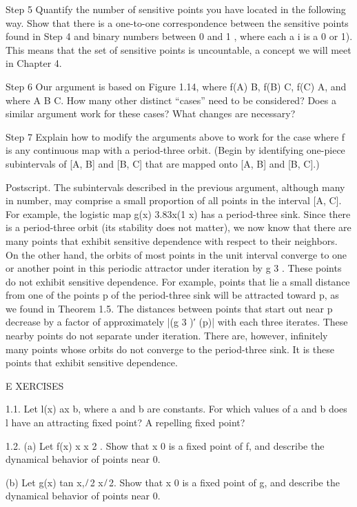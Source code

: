 \documentclass[12pt]{article}
\begin{document}
Step 5 Quantify the number of sensitive points you have located in the following way. Show that there is a 
one-to-one correspondence between the sensitive points found in Step 4 and binary numbers between 0 and 1 
, where each a i is a 0 or 1). This means that the set of sensitive points is uncountable, a concept we 
will meet in Chapter 4.

Step 6 Our argument is based on Figure 1.14, where f(A)  B, f(B)  C, f(C)  A, and where A  B  C. How many 
other distinct “cases” need to be considered? Does a similar argument work for these cases? What changes 
are necessary?

Step 7 Explain how to modify the arguments above to work for the case where f is any continuous map with a 
period-three orbit. (Begin by identifying one-piece subintervals of [A, B] and [B, C] that are mapped onto 
[A, B] and [B, C].)

Postscript. The subintervals described in the previous argument, although many in number, may comprise a 
small proportion of all points in the interval [A, C]. For example, the logistic map g(x)  3.83x(1  x) has 
a period-three sink. Since there is a period-three orbit (its stability does not matter), we now know that 
there are many points that exhibit sensitive dependence with respect to their neighbors. On the other hand, 
the orbits of most points in the unit interval converge to one or another point in this periodic attractor 
under iteration by g 3 . These points do not exhibit sensitive dependence. For example, points that lie a 
small distance from one of the points p of the period-three sink will be attracted toward p, as we found in 
Theorem 1.5. The distances between points that start out near p decrease by a factor of approximately |(g 3 
)′ (p)| with each three iterates. These nearby points do not separate under iteration. There are, however, 
inﬁnitely many points whose orbits do not converge to the period-three sink. It is these points that 
exhibit sensitive dependence.

E XERCISES

1.1. Let l(x)  ax b, where a and b are constants. For which values of a and b does l have an attracting 
ﬁxed point? A repelling ﬁxed point?

1.2. (a) Let f(x)  x  x 2 . Show that x  0 is a ﬁxed point of f, and describe the dynamical behavior of 
points near 0.

(b) Let g(x)  tan x,  
 ̸ 2  x  
 ̸ 2. Show that x  0 is a ﬁxed point of g, and describe the dynamical behavior of points near 0.
\end{document}
